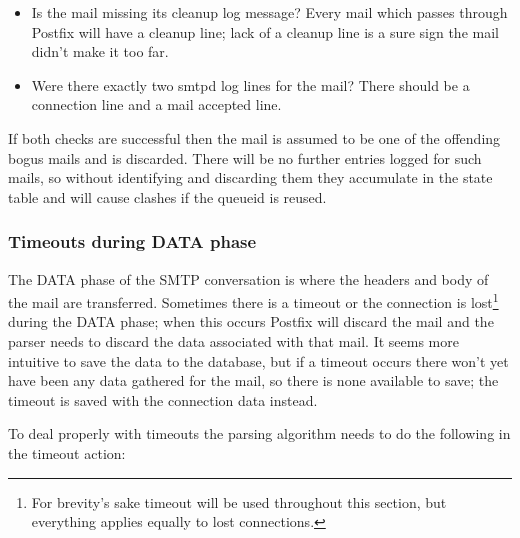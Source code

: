 \documentclass[a4paper,12pt,draft]{article}
\begin{document}
\begin{itemize}

    \item Is the mail missing its cleanup log message?  Every mail which
        passes through Postfix will have a cleanup line; lack of a cleanup
        line is a sure sign the mail didn't make it too far.

    \item Were there exactly two smtpd log lines for the mail?  There
        should be a connection line and a mail accepted line.

\end{itemize}

If both checks are successful then the mail is assumed to be one of the
offending bogus mails and is discarded.  There will be no further entries
logged for such mails, so without identifying and discarding them they
accumulate in the state table and will cause clashes if the queueid is
reused.

\subsubsection{Timeouts during DATA phase}

\label{timeouts-during-data-phase}

The DATA phase of the SMTP conversation is where the headers and body of the
mail are transferred.  Sometimes there is a timeout or the connection is
lost\footnote{For brevity's sake timeout will be used throughout this
section, but everything applies equally to lost connections.} during the
DATA phase; when this occurs Postfix will discard the mail and the parser
needs to discard the data associated with that mail.  It seems more
intuitive to save the data to the database, but if a timeout occurs there
won't yet have been any data gathered for the mail, so there is none
available to save; the timeout is saved with the connection data instead.

To deal properly with timeouts the parsing algorithm needs to do the
following in the timeout action:
\end{document}
